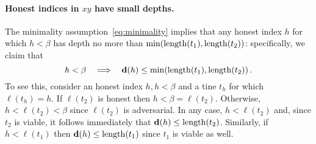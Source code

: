     \paragraph{Honest indices in $xy$ have small depths.}
    The minimality assumption~\eqref{eq:minimality} implies that any honest
    index $h$ for which $h < \beta$ has depth no more than
    $\min(\operatorname{length}(t_1),\operatorname{length}(t_2))$: specifically, we claim that 
    \begin{equation}\label{eq:honest-depth}
      h < \beta \quad\Longrightarrow \quad \mathbf{d}(h) \leq \min(\operatorname{length}(t_1), \operatorname{length}(t_2))\,.
    \end{equation}
    To see this, consider an honest index $h,h < \beta$ and a tine $t_h$
    for which $\ell(t_h) = h$. 
    If $\ell(t_2)$ is honest then $h < \beta = \ell(t_2)$. 
    Otherwise, $h < \ell(t_2) < \beta$ since $\ell(t_2)$ is adversarial. 
    In any case, $h < \ell(t_2)$ and, 
    since $t_2$ is viable, it follows immediately that
    $\mathbf{d}(h) \leq \operatorname{length}(t_2)$. 
    Similarly, if $h < \ell(t_1)$ 
    then $\mathbf{d}(h) \leq \operatorname{length}(t_1)$ since $t_1$ is viable as well. 
    
